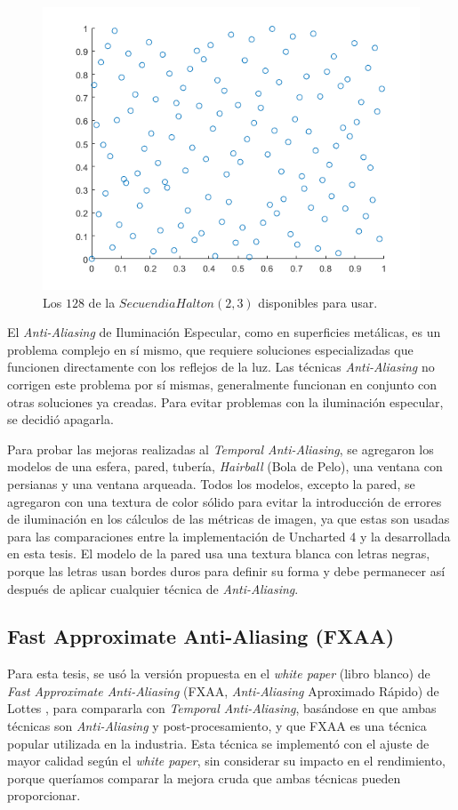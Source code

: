 \documentclass[pregrado]{tesis-usb} %
\begin{document}
\begin{figure}[!hbt]
	\centering
	\includegraphics[scale=0.5]{images/halton_128.png}
	\caption{Los $128$ de la $Secuendia Halton (2,3)$ disponibles para usar.}\label{fig:halton128}
\end{figure}

El \textit{Anti-Aliasing} de Iluminación Especular, como en superficies metálicas, es un problema complejo en sí mismo, que requiere soluciones especializadas que funcionen directamente con los reflejos de la luz. Las técnicas \textit{Anti-Aliasing} no corrigen este problema por sí mismas, generalmente funcionan en conjunto con otras soluciones ya creadas. Para evitar problemas con la iluminación especular, se decidió apagarla.

Para probar las mejoras realizadas al \textit{Temporal Anti-Aliasing}, se agregaron los modelos de una esfera, pared, tubería, \textit{Hairball} (Bola de Pelo), una ventana con persianas y una ventana arqueada. Todos los modelos, excepto la pared, se agregaron con una textura de color sólido para evitar la introducción de errores de iluminación en los cálculos de las métricas de imagen, ya que estas son usadas para las comparaciones entre la implementación de Uncharted 4 y la desarrollada en esta tesis. El modelo de la pared usa una textura blanca con letras negras, porque las letras usan bordes duros para definir su forma y debe permanecer así después de aplicar cualquier técnica de \textit{Anti-Aliasing}.

\subsection{Fast Approximate Anti-Aliasing (FXAA)}
Para esta tesis, se usó la versión propuesta en el \textit{white paper} (libro blanco) de \textit{Fast Approximate Anti-Aliasing} (FXAA, \textit{Anti-Aliasing} Aproximado Rápido) de Lottes \cite{Lottes2009}, para compararla con \textit{Temporal Anti-Aliasing}, basándose en que ambas técnicas son \textit{Anti-Aliasing} y post-procesamiento, y que FXAA es una técnica popular utilizada en la industria. Esta técnica se implementó con el ajuste de mayor calidad según el \textit{white paper}, sin considerar su impacto en el rendimiento, porque queríamos comparar la mejora cruda que ambas técnicas pueden proporcionar.
\end{document}
